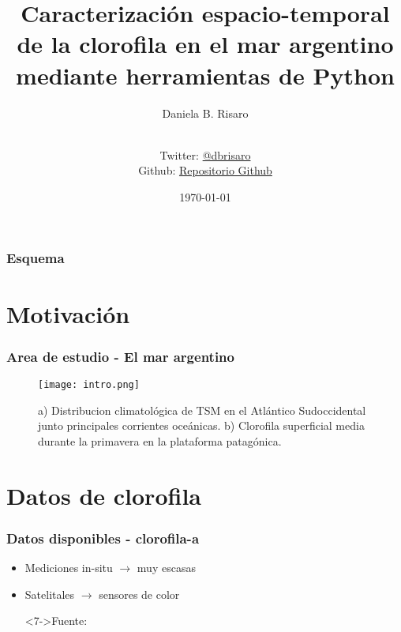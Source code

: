 \documentclass{beamer}
\title[Python para SIG]{Caracterización espacio-temporal de la clorofila en el mar argentino mediante herramientas de Python}
\subtitle{}
\author[Risaro, Daniela B]{Daniela B. Risaro\inst{1} \inst{2}}
\author[Risaro, Daniela B]{\parbox{.5\textwidth}{\centering {Daniela B. Risaro\inst{1} \inst{2}}\\[3pt]
		\scriptsize Twitter: \href{http://www.twitter.com/dbrisaro}{@dbrisaro} \\
		Github: \href{https://github.com/dbrisaro/charla_GIS}{Repositorio Github}}}
\institute[SHN-UBA] %
{
	\inst{1}%
	Departamento de Oceanografía\\
	Servicio de Hidrografía Naval (SHN)
	\and
	\inst{2}%
	Facultad de Cs Exactas y Naturales\\
	Universidad de Buenos Aires (UBA)
}
\date{\today}
\begin{document}
\begin{frame}
 \titlepage
\end{frame}

\begin{frame}
\frametitle{Esquema}
\tableofcontents
\end{frame} 

\section{Motivación}

\begin{frame}
 \frametitle{Area de estudio - El mar argentino}
 
\begin{figure}
 \texttt{[image: intro.png]}
\caption{a) Distribucion climatológica de TSM en el Atlántico Sudoccidental junto principales corrientes oceánicas. b) Clorofila superficial media durante la primavera en la plataforma patagónica.}
 \end{figure}
\end{frame}


\section{Datos de clorofila}

\begin{frame}[t]
 \frametitle{Datos disponibles - clorofila-a}

  \begin{itemize}
   \item<1-> Mediciones in-situ \pause $\rightarrow$ muy escasas
   \item<3-> Satelitales  \pause $\rightarrow$ sensores de color
      
   \begin{figure}
   \end{figure}

\item[]<7->\tiny{Fuente: \href{https://oceancolor.gsfc.nasa.gov/docs/odps_opdsmp.may2018.pdf}{}}
  \end{itemize}
\end{frame}
\end{document}
